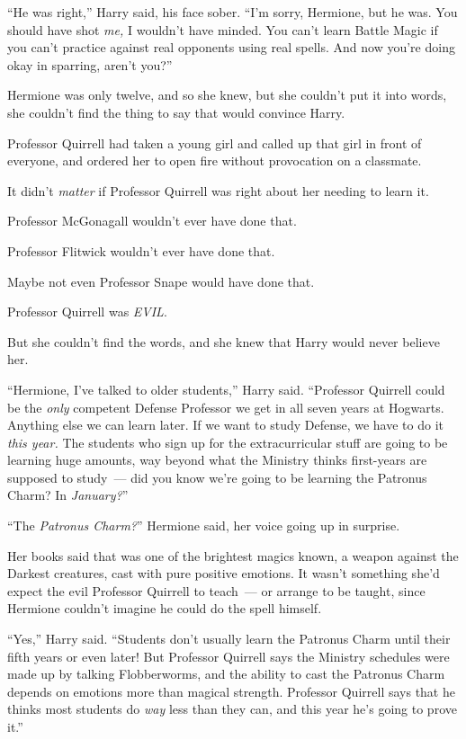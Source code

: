 ``He was right,'' Harry said, his face sober. ``I'm sorry, Hermione, but he was. You should have shot \emph{me,} I wouldn't have minded. You can't learn Battle Magic if you can't practice against real opponents using real spells. And now you're doing okay in sparring, aren't you?''

Hermione was only twelve, and so she knew, but she couldn't put it into words, she couldn't find the thing to say that would convince Harry.

Professor Quirrell had taken a young girl and called up that girl in front of everyone, and ordered her to open fire without provocation on a classmate.

It didn't \emph{matter} if Professor Quirrell was right about her needing to learn it.

Professor McGonagall wouldn't ever have done that.

Professor Flitwick wouldn't ever have done that.

Maybe not even Professor Snape would have done that.

Professor Quirrell was \emph{EVIL}.

But she couldn't find the words, and she knew that Harry would never believe her.

``Hermione, I've talked to older students,'' Harry said. ``Professor Quirrell could be the \emph{only} competent Defense Professor we get in all seven years at Hogwarts. Anything else we can learn later. If we want to study Defense, we have to do it \emph{this year.} The students who sign up for the extracurricular stuff are going to be learning huge amounts, way beyond what the Ministry thinks first-years are supposed to study~--- did you know we're going to be learning the Patronus Charm? In \emph{January?}''

``The \emph{Patronus Charm?}'' Hermione said, her voice going up in surprise.

Her books said that was one of the brightest magics known, a weapon against the Darkest creatures, cast with pure positive emotions. It wasn't something she'd expect the evil Professor Quirrell to teach~--- or arrange to be taught, since Hermione couldn't imagine he could do the spell himself.

``Yes,'' Harry said. ``Students don't usually learn the Patronus Charm until their fifth years or even later! But Professor Quirrell says the Ministry schedules were made up by talking Flobberworms, and the ability to cast the Patronus Charm depends on emotions more than magical strength. Professor Quirrell says that he thinks most students do \emph{way} less than they can, and this year he's going to prove it.''

